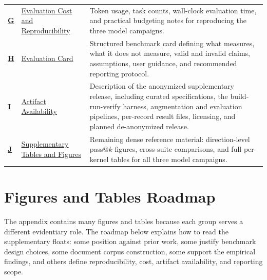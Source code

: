 \begin{center}
\begin{tabularx}{0.98\textwidth}{@{}
>{\bfseries}p{}
>{\RaggedRight\arraybackslash}p{\appendixsectionwidth}
X
@{}}
\hyperref[sec:appendix-j]{G}
& \hyperref[sec:appendix-j]{Evaluation Cost and Reproducibility}
& Token usage, task counts, wall-clock evaluation time, and practical budgeting notes for reproducing
the three model campaigns. \\

\hyperref[sec:appendix-k]{H}
& \hyperref[sec:appendix-k]{Evaluation Card}
& Structured benchmark card defining what \parbench{} measures, what it does not measure,
valid and invalid claims, assumptions, user guidance, and recommended reporting protocol. \\

\hyperref[sec:artifact-availability]{I}
& \hyperref[sec:artifact-availability]{Artifact Availability}
& Description of the anonymized supplementary release, including curated specifications,
the build-run-verify harness, augmentation and evaluation pipelines, per-record result files,
licensing, and planned de-anonymized release. \\

\hyperref[sec:appendix-f]{J}
& \hyperref[sec:appendix-f]{Supplementary Tables and Figures}
& Remaining dense reference material: direction-level pass@$k$ figures, cross-suite comparisons, and full per-kernel tables for all three model campaigns. \\

\bottomrule
\end{tabularx}
\end{center}


\newpage
\vspace{1.0em}
\section*{Figures and Tables Roadmap}
\label{sec:appendix-float-roadmap}

The appendix contains many figures and tables because each group serves a different
evidentiary role. The roadmap below explains how to read the supplementary floats:
some position \parbench{} against prior work, some justify benchmark design choices,
some document corpus construction, some support the empirical findings, and others
define reproducibility, cost, artifact availability, and reporting scope.

